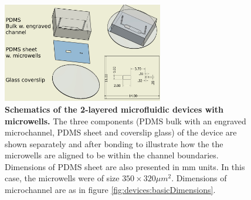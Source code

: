         \begin{figure}[h]
            \centering
            \includegraphics[width=7cm]{chapter4/figures/lithoMWell/lithoMWell.jpg}
            \caption[Schematics of the 2-layered microfluidic devices with microwells]{\textbf{Schematics of the 2-layered microfluidic devices with microwells.}
            The three components (PDMS bulk with an engraved microchannel, PDMS sheet and coverslip glass) of the device are shown separately and after bonding to illustrate how the the microwells are aligned to be within the channel boundaries. Dimensions of PDMS sheet are also presented in mm units. In this case, the microwells were of size \(350\times320 \mu m^2\). Dimensions of microchannel are as in figure \ref{fig:devices:basicDimensions}.}
            \label{fig:devices:lithoMWell}
        \end{figure}
